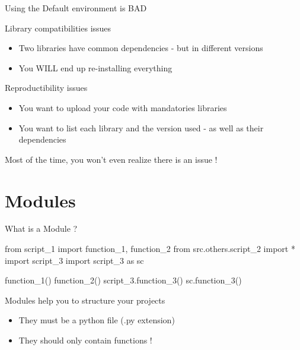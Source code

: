 \documentclass[serif, aspectratio=169]{beamer}
\begin{document}
\begin{frame}{Using the Default environment is BAD}
    \begin{block}{Library compatibilities issues}
        \begin{itemize}
            \item Two libraries have common dependencies - but in different versions
            \item You WILL end up re-installing everything
        \end{itemize}
    \end{block}
    \begin{block}{Reproductibility issues}
        \begin{itemize}
            \item You want to upload your code with mandatories libraries
            \item You want to list each library and the version used - as well as their dependencies
        \end{itemize}
    \end{block}
    \vfill
    \begin{center}
        \Large
        Most of the time, you won't even realize there is an issue !
    \end{center}
\end{frame}

\section{Modules}

\begin{frame}[fragile]{What is a Module ?}
    \begin{pythoncode}
    from script_1 import function_1, function_2
    from src.others.script_2 import *
    import script_3
    import script_3 as sc

    function_1()
    function_2()
    script_3.function_3()
    sc.function_3()
    \end{pythoncode}
    \vfill
    \begin{block}{Modules help you to structure your projects}
        \begin{itemize}
            \item They must be a python file (.py extension)
            \item They should only contain functions !
        \end{itemize}
    \end{block}
\end{frame}
\end{document}
